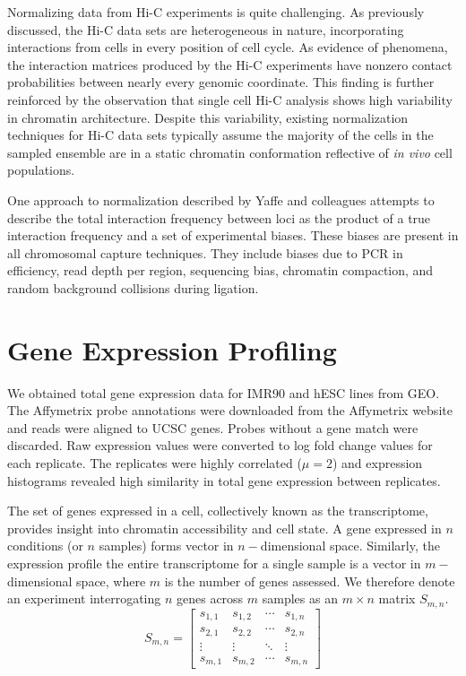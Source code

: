 Normalizing data from Hi-C experiments is quite challenging.  As previously
discussed, the Hi-C data sets are heterogeneous in nature, incorporating
interactions from cells in every position of cell cycle.  As evidence of phenomena,
the interaction matrices produced by the Hi-C experiments have nonzero contact
probabilities between nearly every genomic coordinate\cite{dekker2013}.  This
finding is further reinforced by the observation that single cell Hi-C analysis
shows high variability in chromatin architecture\cite{nagano2013}.  Despite this
variability, existing normalization techniques for Hi-C data sets typically
assume the majority of the cells in the sampled ensemble are in a static
chromatin conformation reflective of \textit{in vivo} cell populations.

One approach to normalization described by Yaffe and colleagues\cite{yaffe2011}
attempts to describe the total interaction frequency between loci as the product
of a true interaction frequency and a set of experimental biases.  These biases
are present in all chromosomal capture techniques.  They include biases due to
PCR in efficiency, read depth per region, sequencing bias, chromatin compaction,
and random background collisions during ligation\cite{benner2014}\cite{dekker2006}.

\section*{Gene Expression Profiling}

We obtained total gene expression data for IMR90 and \gls{hESC} lines from \gls{GEO}.  The Affymetrix probe annotations were
downloaded from the Affymetrix website and reads were aligned to UCSC genes.  Probes without a gene match were discarded.  Raw
expression values were converted to log fold change values for each replicate.  The replicates were highly correlated ($\mu = 2$)
and expression histograms revealed high similarity in total gene expression between replicates.


The set of genes expressed in a cell, collectively known as the \gls{transcriptome}, provides insight into chromatin accessibility
and cell state.  A gene expressed in $n$ conditions (or $n$ samples) forms vector in $n-$dimensional space.  Similarly, the expression
profile the entire transcriptome for a single sample is a vector in $m-$dimensional space, where $m$ is the number of genes assessed.
We therefore denote an experiment interrogating $n$ genes across $m$ samples as an $m \times n$ matrix $S_{m,n}$.
\[
  S_{m,n} = \left[
    \begin{array}{cccc}
      s_{1,1} & s_{1,2} & \cdots & s_{1,n} \\
      s_{2,1} & s_{2,2} & \cdots & s_{2,n} \\
      \vdots & \vdots & \ddots  & \vdots \\
      s_{m,1} & s_{m,2} & \cdots & s_{m,n}
    \end{array}
  \right]
\]

